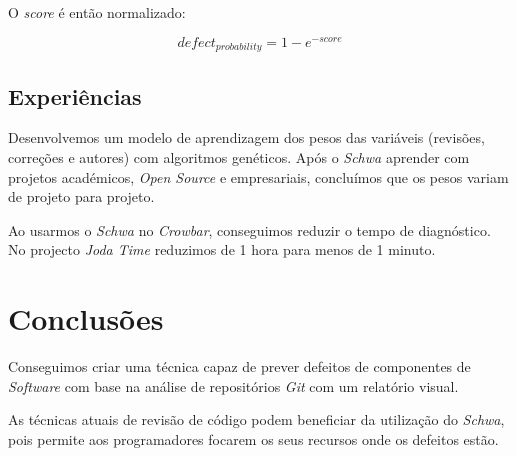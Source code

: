 \documentclass[9pt,a4paper]{extarticle}
\begin{document}
\begin{multicols}{2}
O \emph{score} é então normalizado:

\begin{equation}
defect_{probability} = 1 - e^{-score}
\end{equation}

\subsection{Experiências}
Desenvolvemos um modelo de aprendizagem dos pesos das variáveis (revisões,
correções e autores) com algoritmos genéticos. Após o \emph{Schwa} aprender com
projetos académicos, \emph{Open Source} e empresariais, concluímos que os pesos
variam de projeto para projeto.

Ao usarmos o \emph{Schwa} no \emph{Crowbar}, conseguimos reduzir o tempo de
diagnóstico. No projecto \emph{Joda Time} reduzimos de 1 hora para menos de 1 minuto.

\section{Conclusões}\label{sec:conclui}
Conseguimos criar uma técnica capaz de prever defeitos de componentes de
\emph{Software} com base na análise de repositórios \emph{Git} com um relatório visual.

As técnicas atuais de revisão de código podem beneficiar da utilização do \emph{Schwa},
pois permite aos programadores focarem os seus recursos onde os defeitos estão.



\end{multicols}
\end{document}
